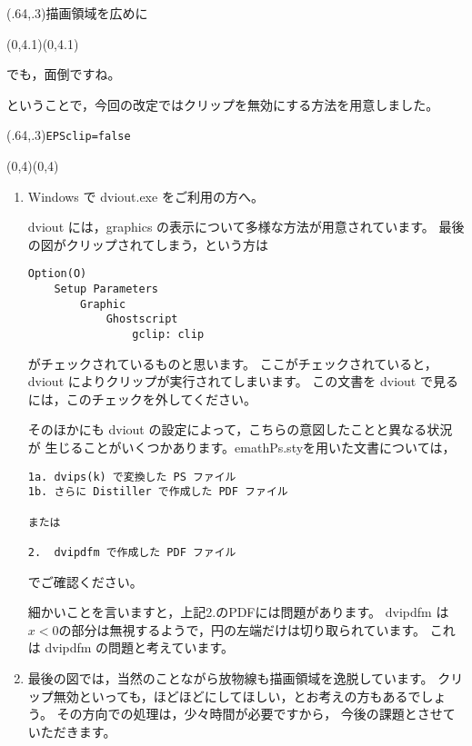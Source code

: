 \documentclass[a4j]{jarticle}
\begin{document}
\begin{showEx}(.64,.3){描画領域を広めに}
\begin{pszahyou*}[ul=20pt](0,4.1)(0,4.1)
\end{pszahyou*}
\end{showEx}

でも，面倒ですね。
\bigskip

ということで，今回の改定ではクリップを無効にする方法を用意しました。

\begin{showEx}(.64,.3){\texttt{EPSclip=false}}
\begin{pszahyou*}[ul=20pt,EPSclip=false](0,4)(0,4)
\end{pszahyou*}
\end{showEx}

\bigskip
\begin{enumerate}[注1.~]
  \item Windows で dviout.exe をご利用の方へ。
  
    dviout には，graphics の表示について多様な方法が用意されています。
    最後の図がクリップされてしまう，という方は
    \begin{jquote}
    \begin{verbatim}
Option(O)
    Setup Parameters
        Graphic
            Ghostscript
                gclip: clip
    \end{verbatim}
    \end{jquote}
    がチェックされているものと思います。
    ここがチェックされていると，dviout によりクリップが実行されてしまいます。
    この文書を dviout で見るには，このチェックを外してください。
    
    そのほかにも dviout の設定によって，こちらの意図したことと異なる状況が
    生じることがいくつかあります。\textsf{emathPs.sty}を用いた文書については，
\begin{jquote}
\begin{verbatim}
1a. dvips(k) で変換した PS ファイル
1b. さらに Distiller で作成した PDF ファイル

または

2.  dvipdfm で作成した PDF ファイル
\end{verbatim}
\end{jquote}
    でご確認ください。

細かいことを言いますと，上記2.のPDFには問題があります。
dvipdfm は$x<0$の部分は無視するようで，円の左端だけは切り取られています。
これは dvipdfm の問題と考えています。

  \item 最後の図では，当然のことながら放物線も描画領域を逸脱しています。
    クリップ無効といっても，ほどほどにしてほしい，とお考えの方もあるでしょう。
    その方向での処理は，少々時間が必要ですから，
    今後の課題とさせていただきます。
\end{enumerate}
\end{document}
